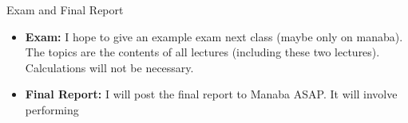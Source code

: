\documentclass[aspectratio=169]{beamer}
\begin{document}
\begin{frame}{Exam and Final Report}
  \begin{itemize}
    \item {\bf Exam:} I hope to give an example exam next class (maybe only on manaba). The topics are the contents of all lectures (including these two lectures). Calculations will not be necessary. 
    
    \item {\bf Final Report:} I will post the final report to Manaba ASAP. It will involve performing 
  \end{itemize}
  
\end{frame}



\end{document}
